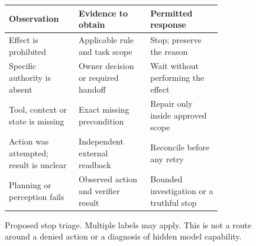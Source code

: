 \begin{figure}[htbp]
\centering\small
\begin{tabular}{|p{0.27\linewidth}|p{0.29\linewidth}|p{0.29\linewidth}|}
\hline
\textbf{Observation} & \textbf{Evidence to obtain} & \textbf{Permitted response} \\
\hline
Effect is prohibited & Applicable rule and task scope & Stop; preserve the reason \\
\hline
Specific authority is absent & Owner decision or required handoff & Wait without performing the effect \\
\hline
Tool, context or state is missing & Exact missing precondition & Repair only inside approved scope \\
\hline
Action was attempted; result is unclear & Independent external readback & Reconcile before any retry \\
\hline
Planning or perception fails & Observed action and verifier result & Bounded investigation or a truthful stop \\
\hline
\end{tabular}
\caption{Proposed stop triage. Multiple labels may apply. This is not a route around a denied action or a diagnosis of hidden model capability.}
\label{fig:stop-triage}
\end{figure}
